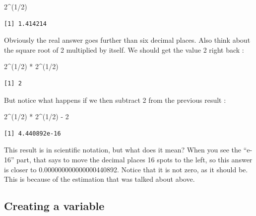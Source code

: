 \documentclass[
  letterpaper,
  DIV=11,
  numbers=noendperiod]{scrreprt}
\newenvironment{Shaded}{\begin{snugshade}}{\end{snugshade}}
\newcommand{\DecValTok}[1]{\textcolor[rgb]{0.68,0.00,0.00}{#1}}
\newcommand{\NormalTok}[1]{\textcolor[rgb]{0.00,0.23,0.31}{#1}}
\newcommand{\SpecialCharTok}[1]{\textcolor[rgb]{0.37,0.37,0.37}{#1}}
\begin{document}
\begin{Shaded}
\begin{Highlighting}[]
\DecValTok{2}\SpecialCharTok{\^{}}\NormalTok{(}\DecValTok{1}\SpecialCharTok{/}\DecValTok{2}\NormalTok{)}
\end{Highlighting}
\end{Shaded}

\begin{verbatim}
[1] 1.414214
\end{verbatim}

Obviously the real answer goes further than six decimal places. Also
think about the square root of 2 multiplied by itself. We should get the
value 2 right back :

\begin{Shaded}
\begin{Highlighting}[]
\DecValTok{2}\SpecialCharTok{\^{}}\NormalTok{(}\DecValTok{1}\SpecialCharTok{/}\DecValTok{2}\NormalTok{) }\SpecialCharTok{*} \DecValTok{2}\SpecialCharTok{\^{}}\NormalTok{(}\DecValTok{1}\SpecialCharTok{/}\DecValTok{2}\NormalTok{)}
\end{Highlighting}
\end{Shaded}

\begin{verbatim}
[1] 2
\end{verbatim}

But notice what happens if we then subtract 2 from the previous result :

\begin{Shaded}
\begin{Highlighting}[]
\DecValTok{2}\SpecialCharTok{\^{}}\NormalTok{(}\DecValTok{1}\SpecialCharTok{/}\DecValTok{2}\NormalTok{) }\SpecialCharTok{*} \DecValTok{2}\SpecialCharTok{\^{}}\NormalTok{(}\DecValTok{1}\SpecialCharTok{/}\DecValTok{2}\NormalTok{) }\SpecialCharTok{{-}} \DecValTok{2}
\end{Highlighting}
\end{Shaded}

\begin{verbatim}
[1] 4.440892e-16
\end{verbatim}

This result is in scientific notation, but what does it mean? When you
see the ``e-16'' part, that says to move the decimal places 16 spots to
the left, so this answer is closer to 0.000000000000000440892. Notice
that it is not zero, as it should be. This is because of the estimation
that was talked about above.

\subsection*{Creating a variable}\label{creating-a-variable}
\end{document}
